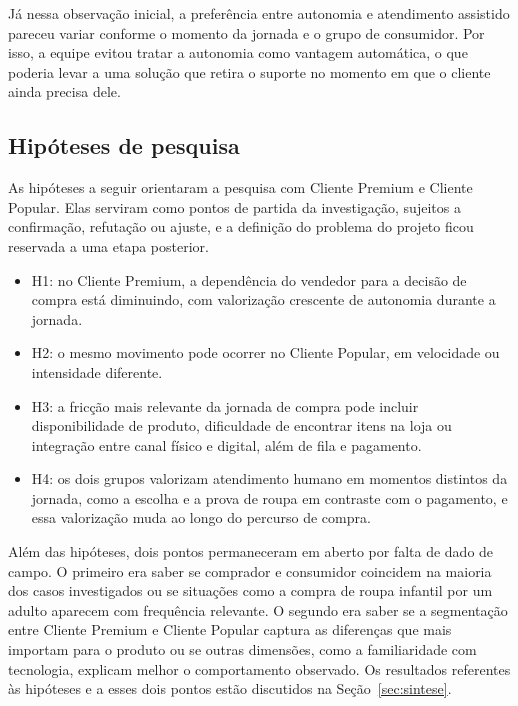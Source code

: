 Já nessa observação inicial, a preferência entre autonomia e atendimento assistido pareceu variar conforme o momento da jornada e o grupo de consumidor. Por isso, a equipe evitou tratar a autonomia como vantagem automática, o que poderia levar a uma solução que retira o suporte no momento em que o cliente ainda precisa dele.

\subsection{Hipóteses de pesquisa}
\label{subsec:clientes_lacunas}
\label{subsubsec:segmentacao_hipoteses}

As hipóteses a seguir orientaram a pesquisa com Cliente Premium e Cliente Popular. Elas serviram como pontos de partida da investigação, sujeitos a confirmação, refutação ou ajuste, e a definição do problema do projeto ficou reservada a uma etapa posterior.

\begin{itemize}
    \item H1: no Cliente Premium, a dependência do vendedor para a decisão de compra está diminuindo, com valorização crescente de autonomia durante a jornada.
    \item H2: o mesmo movimento pode ocorrer no Cliente Popular, em velocidade ou intensidade diferente.
    \item H3: a fricção mais relevante da jornada de compra pode incluir disponibilidade de produto, dificuldade de encontrar itens na loja ou integração entre canal físico e digital, além de fila e pagamento.
    \item H4: os dois grupos valorizam atendimento humano em momentos distintos da jornada, como a escolha e a prova de roupa em contraste com o pagamento, e essa valorização muda ao longo do percurso de compra.
\end{itemize}

Além das hipóteses, dois pontos permaneceram em aberto por falta de dado de campo. O primeiro era saber se comprador e consumidor coincidem na maioria dos casos investigados ou se situações como a compra de roupa infantil por um adulto aparecem com frequência relevante. O segundo era saber se a segmentação entre Cliente Premium e Cliente Popular captura as diferenças que mais importam para o produto ou se outras dimensões, como a familiaridade com tecnologia, explicam melhor o comportamento observado. Os resultados referentes às hipóteses e a esses dois pontos estão discutidos na Seção~\ref{sec:sintese}.
